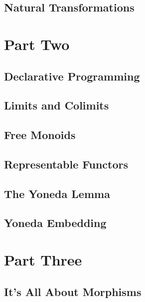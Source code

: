 \chapter{Natural Transformations}\label{chap-natural-transformations}


\part{Part Two}

\chapter{Declarative Programming}\label{declarative-programming}


\chapter{Limits and Colimits}\label{limits-and-colimits}


\chapter{Free Monoids}\label{chap-free-monoids}


\chapter{Representable Functors}\label{chap-representable-functors}


\chapter{The Yoneda Lemma}\label{the-yoneda-lemma}


\chapter{Yoneda Embedding}\label{yoneda-embedding}


\part{Part Three}

\chapter{It's All About Morphisms}


